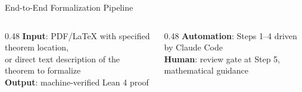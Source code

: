 \documentclass[aspectratio=169, 10pt]{beamer}
\begin{document}
\begin{frame}{End-to-End Formalization Pipeline}
\begin{center}
\end{center}

\vspace{0.3em}
\begin{columns}[T]
\begin{column}{0.48\textwidth}
\textbf{Input}: PDF/LaTeX with specified theorem location,\\
or direct text description of the theorem to formalize\\
\textbf{Output}: machine-verified Lean 4 proof
\end{column}
\begin{column}{0.48\textwidth}
\textbf{Automation}: Steps 1--4 driven by Claude Code\\
\textbf{Human}: review gate at Step 5, mathematical guidance
\end{column}
\end{columns}

\end{frame}
\end{document}
